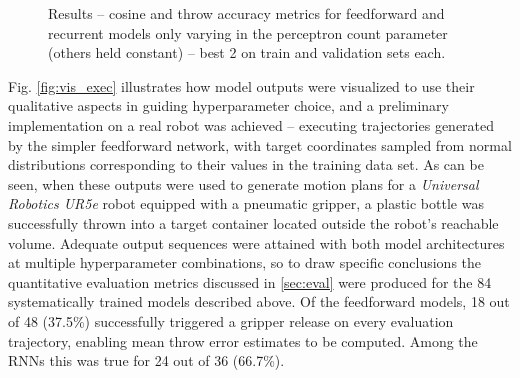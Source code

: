 \documentclass{article}
\begin{document}
\begin{figure}[!hbt]
	\centering
	\caption{Results -- cosine and throw accuracy metrics for feedforward and recurrent models only varying in the perceptron count parameter (others held constant) -- best 2 on train and validation sets each.}
	\label{fig:ind_rnn_naive}
\end{figure}

Fig. \ref{fig:vis_exec} illustrates how model outputs were visualized to use their qualitative aspects in guiding hyperparameter choice, and a preliminary implementation on a real robot was achieved -- executing trajectories generated by the simpler feedforward network, with target coordinates sampled from normal distributions corresponding to their values in the training data set. As can be seen, when these outputs were used to generate motion plans for a \emph{Universal Robotics UR5e} robot equipped with a pneumatic gripper, a plastic bottle was successfully thrown into a target container located outside the robot's reachable volume. Adequate output sequences were attained with both model architectures at multiple hyperparameter combinations, so to draw specific conclusions the quantitative evaluation metrics discussed in \ref{sec:eval} were produced for the 84 systematically trained models described above. Of the feedforward models, 18 out of 48 (37.5\%) successfully triggered a gripper release on every evaluation trajectory, enabling mean throw error estimates to be computed. Among the RNNs this was true for 24 out of 36 (66.7\%).
\end{document}
